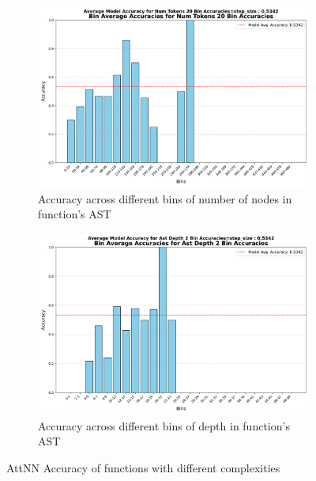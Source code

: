 \documentclass{article}
\begin{document}
\begin{figure}[H]
    \centering
    \begin{subfigure}{0.48\textwidth} 
        \centering
        \includegraphics[width=\linewidth]{figures/attention_nn/ann_acc_num_nodes.pdf}
        \caption{Accuracy across different bins of number of nodes in function's AST}
        \label{fig:distr_names}
    \end{subfigure}
    \hfill
    \begin{subfigure}{0.48\textwidth}
        \centering
        \includegraphics[width=\linewidth]{figures/attention_nn/ann_acc_depth.pdf}
        \caption{Accuracy across different bins of depth in function's AST}
        \label{fig:disrt_lens}
    \end{subfigure}
    \caption{AttNN Accuracy of functions with different complexities}
    \label{fig:eda_distr}
\end{figure}
\end{document}
